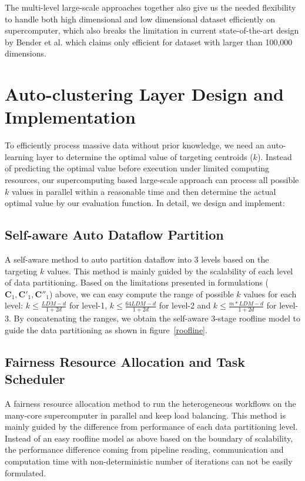 \documentclass[10pt,journal,compsoc]{IEEEtran}
\begin{document}
The multi-level large-scale approaches together also give us the needed flexibility to handle both high dimensional and low dimensional dataset efficiently on supercomputer, which also breaks the limitation in current state-of-the-art design by Bender et al. \cite{bender2015k} which claims only efficient for dataset with larger than 100,000 dimensions. 

\section{Auto-clustering Layer Design and Implementation}\label{auto-implementation}
To efficiently process massive data without prior knowledge, we need an auto-learning layer to determine the optimal value of targeting centroids ($k$). Instead of predicting the optimal value before execution under limited computing resources, our supercomputing based large-scale approach can process all possible $k$ values in parallel within a reasonable time and then determine the actual optimal value by our evaluation function. In detail, we design and implement: 
\subsection{Self-aware Auto Dataflow Partition} 
A self-aware method to auto partition dataflow into 3 levels based on the targeting $k$ values. This method is mainly guided by the scalability of each level of data partitioning. Based on the limitations presented in formulations ($\mathbf{C}_1,\mathbf{C'}_1,\mathbf{C''}_1$) above, we can easy compute the range of possible $k$ values for each level: $k \leq \frac{LDM-d}{1+2d}$ for level-1, $k \leq \frac{64LDM-d}{1+2d}$ for level-2 and $k \leq \frac{m*LDM-d}{1+2d}$ for level-3. By concatenating the ranges, we obtain the self-aware 3-stage roofline model to guide the data partitioning as shown in figure~\ref{roofline}.

\subsection{Fairness Resource Allocation and Task Scheduler} 
A fairness resource allocation method to run the heterogeneous workflows on the many-core supercomputer in parallel and keep load balancing. This method is mainly guided by the difference from performance of each data partitioning level. Instead of an easy roofline model as above based on the boundary of scalability, the performance difference coming from pipeline reading, communication and computation time with non-deterministic number of iterations  can not be easily formulated. 
    
\end{document}
